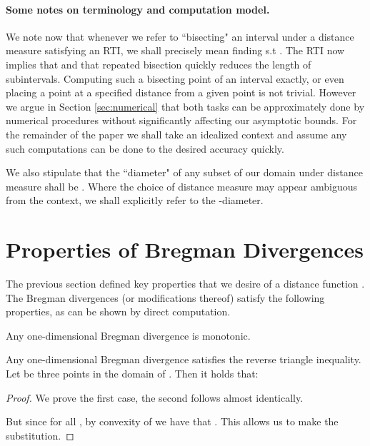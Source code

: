 \documentclass[11pt]{myclass}
\begin{document}
\paragraph{Some notes on terminology and computation model.}
We note now that whenever we refer to ``bisecting" an interval  under a distance measure  satisfying an RTI, we shall precisely mean finding  s.t . The RTI now implies that 
and that repeated bisection quickly reduces the length of subintervals. Computing
such a bisecting point of an interval exactly, or even placing a point at a specified distance from a given point  is not
trivial. However we argue in Section \ref{sec:numerical} that both tasks can be approximately done by numerical procedures
without significantly affecting our asymptotic bounds. For the remainder of the paper we shall take an idealized context and assume any such computations
can be done to the desired accuracy quickly. 

We also stipulate that the ``diameter" of any subset of our domain  under distance measure  shall be .
Where the choice of distance measure  may appear ambiguous from the context, we shall explicitly refer to the -diameter.

\section{Properties of Bregman Divergences}\label{sec:properties}
\label{sec:prop-sqrtd_s-phi}

The previous section defined key properties that we desire of a distance function . The Bregman divergences (or modifications thereof) 
satisfy the following properties, as can be shown by direct computation. 

\begin{lemma}\label{lefttr}
Any one-dimensional Bregman divergence is monotonic.
\end{lemma}
\begin{lemma}\label{cover}
Any one-dimensional Bregman divergence satisfies the reverse triangle inequality. 
Let  be three points in the domain of . Then it holds that:



\end{lemma}

\begin{proof}
We prove the first case, the second follows almost identically.



But since  for all , by convexity of  we have that . This allows us
to make the substitution.



\end{proof}
\end{document}
